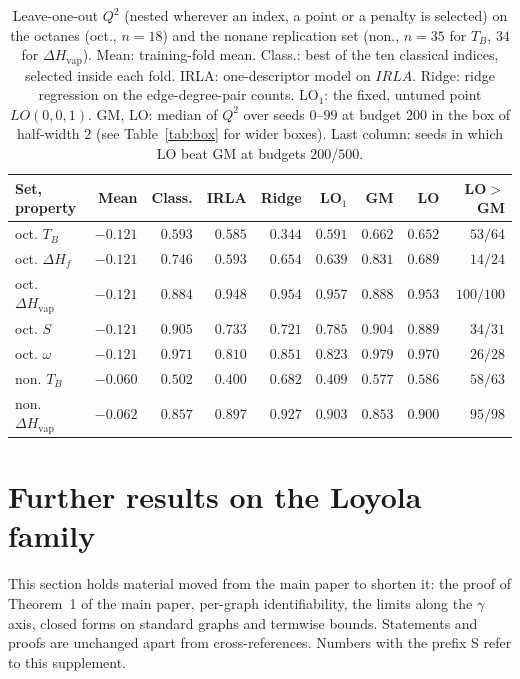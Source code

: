 \documentclass[a5paper, 10pt]{article}
\theoremstyle{plain}
\theoremstyle{remark}
\theoremstyle{definition}
\begin{document}
\begin{table}[htbp]
\centering
\caption{Leave-one-out $Q^2$ (nested wherever an index, a point or a penalty is selected) on the octanes (oct., $n = 18$) and
the nonane replication set (non., $n = 35$ for $T_B$, $34$ for
$\Delta H_{\mathrm{vap}}$). Mean: training-fold mean. Class.: best of the
ten classical indices, selected inside each fold. IRLA: one-descriptor
model on $IRLA$. Ridge: ridge regression on the edge-degree-pair counts.
LO$_1$: the fixed, untuned point $LO(0,0,1)$. GM, LO: median of $Q^2$
over seeds $0$--$99$ at budget $200$ in the box of half-width $2$
(see Table~\ref{tab:box} for wider boxes). Last column: seeds in which
LO beat GM at budgets $200$/$500$.}
\label{tab:external}
\small
\setlength{\tabcolsep}{2pt}
\begin{tabular}{lrrrrrrrr}
\toprule
Set, property & Mean & Class. & IRLA & Ridge & LO$_1$ & GM & LO & LO$>$GM\\
\midrule
oct. $T_B$ & $-0.121$ & $0.593$ & $0.585$ & $0.344$ & $0.591$ & $0.662$ & $0.652$ & $53/64$\\
oct. $\Delta H_f$ & $-0.121$ & $0.746$ & $0.593$ & $0.654$ & $0.639$ & $0.831$ & $0.689$ & $14/24$\\
oct. $\Delta H_{\mathrm{vap}}$ & $-0.121$ & $0.884$ & $0.948$ & $0.954$ & $0.957$ & $0.888$ & $0.953$ & $100/100$\\
oct. $S$ & $-0.121$ & $0.905$ & $0.733$ & $0.721$ & $0.785$ & $0.904$ & $0.889$ & $34/31$\\
oct. $\omega$ & $-0.121$ & $0.971$ & $0.810$ & $0.851$ & $0.823$ & $0.979$ & $0.970$ & $26/28$\\
non. $T_B$ & $-0.060$ & $0.502$ & $0.400$ & $0.682$ & $0.409$ & $0.577$ & $0.586$ & $58/63$\\
non. $\Delta H_{\mathrm{vap}}$ & $-0.062$ & $0.857$ & $0.897$ & $0.927$ & $0.903$ & $0.853$ & $0.900$ & $95/98$\\
\bottomrule
\end{tabular}
\end{table}

\FloatBarrier
\section{Further results on the Loyola family}\label{sec:s-math}

This section holds material moved from the main paper to shorten it: the proof of
Theorem~1 of the main paper, per-graph identifiability, the limits along the $\gamma$ axis, closed forms
on standard graphs and termwise bounds. Statements and proofs are unchanged apart from
cross-references. Numbers with the prefix S refer to this supplement.
\end{document}
